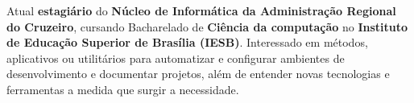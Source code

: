 

\begin{cvparagraph}

Atual \textbf{estagiário} do \textbf{Núcleo de Informática da Administração Regional do Cruzeiro}, cursando Bacharelado de \textbf{Ciência da computação} no \textbf{Instituto de Educação Superior de Brasília (IESB)}. Interessado em métodos, aplicativos ou utilitários para automatizar e configurar ambientes de desenvolvimento e documentar projetos, além de entender novas tecnologias e ferramentas a medida que surgir a necessidade.

\end{cvparagraph}
